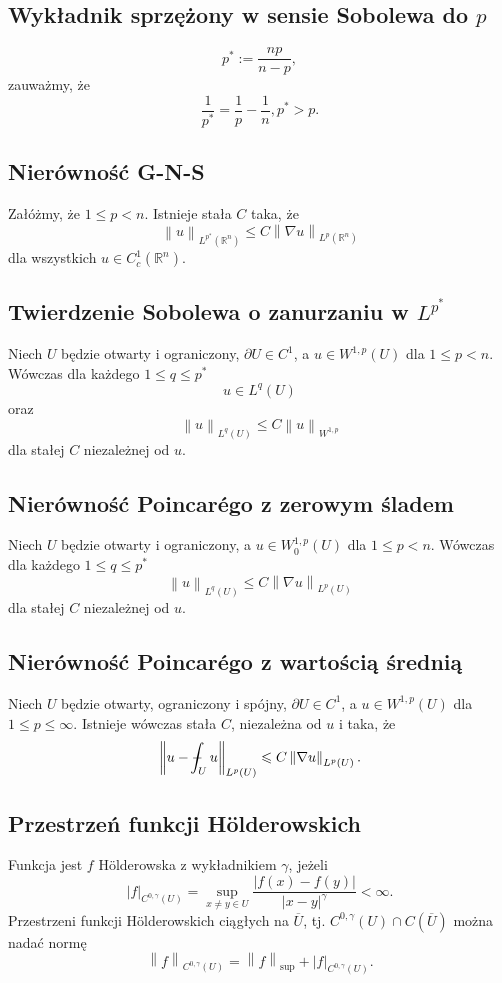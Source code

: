 \documentclass[letterpaper,12pt]{article}
\newcommand{\norm}[1]{\left\lVert#1\right\rVert}
\def\Xint#1{\mathchoice
   {\XXint\displaystyle\textstyle{#1}}%
   {\XXint\textstyle\scriptstyle{#1}}%
   {\XXint\scriptstyle\scriptscriptstyle{#1}}%
   {\XXint\scriptscriptstyle\scriptscriptstyle{#1}}%
   \!\int}
\def\XXint#1#2#3{{\setbox0=\hbox{$#1{#2#3}{\int}$}
     \vcenter{\hbox{$#2#3$}}\kern-.5\wd0}}
\def\dashint{\Xint-}
\newcommand{\R}{\mathbb{R}}
\renewcommand{\leq}{\leqslant}
\begin{document}
\subsection{Wykładnik sprzężony w sensie Sobolewa do $p$}
$$ p^* := \frac{np}{n-p}, $$
zauważmy, że
$$ \frac{1}{p^*} = \frac{1}{p} - \frac{1}{n}, p^* > p.$$

\subsection{Nierówność G-N-S}
Załóżmy, że $1 \leq p < n$. Istnieje stała $C$ taka, że 
$$\norm{u}_{L^{p^*}(\R^n)} \leq C \norm{\nabla u}_{L^p(\R^n)}$$
dla wszystkich $u \in C^1_c(\R^n)$.

\subsection{Twierdzenie Sobolewa o zanurzaniu w $L^{p^*}$}
Niech $U$ będzie otwarty i ograniczony, $\partial U \in C^1$, a $u \in W^{1,p}(U)$ dla $1 \leq p < n$.
Wówczas dla każdego $1 \leq q \leq p^*$
$$ u \in L^q(U) $$
oraz
$$\norm{u}_{L^q(U)} \leq C \norm{u}_{W^{1,p}}$$
dla stałej $C$ niezależnej od $u$.

\subsection{Nierówność Poincar\'ego z zerowym śladem}
Niech $U$ będzie otwarty i ograniczony, a $u \in W^{1,p}_0(U)$ dla $1 \leq p < n$.
Wówczas dla każdego $1 \leq q \leq p^*$
$$\norm{u}_{L^q(U)} \leq C \norm{\nabla u}_{L^p(U)}$$
dla stałej $C$ niezależnej od $u$.

\subsection{Nierówność Poincar\'ego z wartością średnią}
Niech $U$ będzie otwarty, ograniczony i spójny, $\partial U \in C^1$, a $u \in W^{1,p}(U)$ dla $1 \leq p \leq \infty$.
Istnieje wówczas stała $C$, niezależna od $u$ i taka, że
$$\norm{u - \dashint_U u}_{L^p(U)} \leq C \norm{\nabla u}_{L^p(U)}.$$

\subsection{Przestrzeń funkcji H\"olderowskich}
Funkcja jest $f$ H\"olderowska z wykładnikiem $\gamma$, jeżeli
$$ |f|_{C^{0, \gamma}(U)} = \sup_{x \neq y \in U} \frac{|f(x)-f(y)|}{|x-y|^\gamma} < \infty.$$
Przestrzeni funkcji H\"olderowskich ciągłych na $\overline{U}$, tj. $C^{0, \gamma}(U) \cap C(\overline{U})$ można nadać normę
$$ \norm{f}_{C^{0, \gamma}(U)} = \norm{f}_\text{sup} + |f|_{C^{0, \gamma}(U)}.$$
\end{document}
